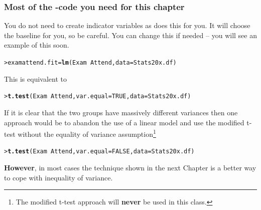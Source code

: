\documentclass{beamer}\usepackage[]{graphicx}\usepackage[]{xcolor}
\makeatletter
\newcommand{\hlnum}[1]{\textcolor[rgb]{0.686,0.059,0.569}{#1}}%
\newcommand{\hlopt}[1]{\textcolor[rgb]{0,0,0}{#1}}%
\newcommand{\hlstd}[1]{\textcolor[rgb]{0.345,0.345,0.345}{#1}}%
\newcommand{\hlkwb}[1]{\textcolor[rgb]{0.69,0.353,0.396}{#1}}%
\newcommand{\hlkwc}[1]{\textcolor[rgb]{0.333,0.667,0.333}{#1}}%
\newcommand{\hlkwd}[1]{\textcolor[rgb]{0.737,0.353,0.396}{\textbf{#1}}}%
\newenvironment{kframe}{%
 \def\at@end@of@kframe{}%
 \ifinner\ifhmode%
  \def\at@end@of@kframe{\end{minipage}}%
  \begin{minipage}{\columnwidth}%
 \fi\fi%
 \def\FrameCommand##1{\hskip\@totalleftmargin \hskip-\fboxsep
 \colorbox{shadecolor}{##1}\hskip-\fboxsep
     \hskip-\linewidth \hskip-\@totalleftmargin \hskip\columnwidth}%
 \MakeFramed {\advance\hsize-\width
   \@totalleftmargin\z@ \linewidth\hsize
   \@setminipage}}%
 {\par\unskip\endMakeFramed%
 \at@end@of@kframe}
\newenvironment{knitrout}{}{} %
\makeatother
\begin{document}
\begin{frame}[fragile]
\frametitle{Most of the -code you need for this chapter}

You do not need to create indicator variables as  does this for you. It will choose the baseline for you, so be careful.  You can change this if needed -- you will see an example of this soon. 
\medskip

\begin{knitrout}\scriptsize
{}\color{fgcolor}\begin{kframe}
\begin{alltt}
\hlstd{> }\hlstd{examattend.fit} \hlkwb{=} \hlkwd{lm}\hlstd{(Exam}\hlopt{~} \hlstd{Attend,} \hlkwc{data} \hlstd{= Stats20x.df)}
\end{alltt}
\end{kframe}
\end{knitrout}

This is equivalent to 
\begin{knitrout}\scriptsize
{}\color{fgcolor}\begin{kframe}
\begin{alltt}
\hlstd{> }\hlkwd{t.test}\hlstd{(Exam}\hlopt{~} \hlstd{Attend,} \hlkwc{var.equal}\hlstd{=}\hlnum{TRUE}\hlstd{,} \hlkwc{data} \hlstd{= Stats20x.df)}
\end{alltt}
\end{kframe}
\end{knitrout}
\bigskip

If it is clear that the two groups have massively different variances then one approach would be to abandon the use of a linear model and use the modified t-test without the equality of variance assumption\footnote{The modified t-test approach will {\bf never} be used in this class.}  
\begin{knitrout}\scriptsize
{}\color{fgcolor}\begin{kframe}
\begin{alltt}
\hlstd{> }\hlkwd{t.test}\hlstd{(Exam}\hlopt{~} \hlstd{Attend,} \hlkwc{var.equal}\hlstd{=}\hlnum{FALSE}\hlstd{,} \hlkwc{data} \hlstd{= Stats20x.df)}
\end{alltt}
\end{kframe}
\end{knitrout}
\medskip

{\bf However}, in most cases the technique shown in the next Chapter is a better way to cope with inequality of variance.


\end{frame}
\end{document}
